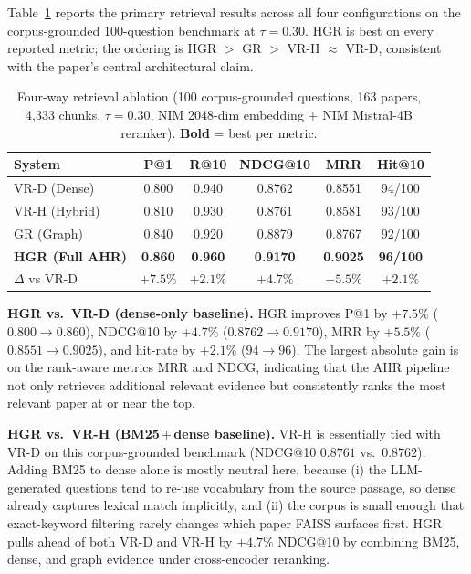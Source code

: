 \documentclass[journal]{IEEEtran}
\begin{document}
Table~\ref{tab:retrieval} reports the primary retrieval results
across all four configurations on the corpus-grounded 100-question
benchmark at $\tau=0.30$. HGR is best on every reported metric; the
ordering is HGR $>$ GR $>$ VR-H $\approx$ VR-D, consistent with the
paper's central architectural claim.

\begin{table}[!t]
\caption{Four-way retrieval ablation (100 corpus-grounded questions,
163 papers, 4{,}333 chunks, $\tau=0.30$, NIM 2048-dim embedding $+$
NIM Mistral-4B reranker). \textbf{Bold} = best per metric.}
\label{tab:retrieval}
\centering
\footnotesize
\setlength{\tabcolsep}{4pt}
\begin{tabular}{@{}lccccc@{}}
\toprule
\textbf{System}
  & \textbf{P@1} & \textbf{R@10}
  & \textbf{NDCG@10} & \textbf{MRR} & \textbf{Hit@10} \\
\midrule
VR-D (Dense)        & 0.800 & 0.940 & 0.8762 & 0.8551 & 94/100 \\
VR-H (Hybrid)       & 0.810 & 0.930 & 0.8761 & 0.8581 & 93/100 \\
GR (Graph)          & 0.840 & 0.920 & 0.8879 & 0.8767 & 92/100 \\
\textbf{HGR (Full AHR)} & \textbf{0.860} & \textbf{0.960}
                    & \textbf{0.9170} & \textbf{0.9025} & \textbf{96/100} \\
\midrule
$\Delta$ vs VR-D    & $+7.5\%$ & $+2.1\%$ & $+4.7\%$ & $+5.5\%$ & $+2.1\%$ \\
\bottomrule
\end{tabular}
\end{table}

\textbf{HGR vs.\ VR-D (dense-only baseline).} HGR improves P@1 by
$+7.5\%$ ($0.800 \to 0.860$), NDCG@10 by $+4.7\%$
($0.8762 \to 0.9170$), MRR by $+5.5\%$ ($0.8551 \to 0.9025$), and
hit-rate by $+2.1\%$ ($94 \to 96$). The largest absolute gain is on
the rank-aware metrics MRR and NDCG, indicating that the AHR pipeline
not only retrieves additional relevant evidence but consistently
ranks the most relevant paper at or near the top.

\textbf{HGR vs.\ VR-H (BM25\,$+$\,dense baseline).} VR-H is
essentially tied with VR-D on this corpus-grounded benchmark
(NDCG@10 $0.8761$ vs.\ $0.8762$). Adding BM25 to dense alone is
mostly neutral here, because (i) the LLM-generated questions tend to
re-use vocabulary from the source passage, so dense already captures
lexical match implicitly, and (ii) the corpus is small enough that
exact-keyword filtering rarely changes which paper FAISS surfaces
first. HGR pulls ahead of both VR-D and VR-H by $+4.7\%$ NDCG@10 by
combining BM25, dense, and graph evidence under cross-encoder
reranking.
\end{document}
